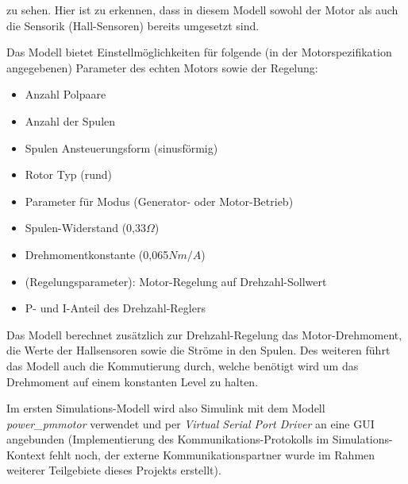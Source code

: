 zu sehen. Hier ist zu erkennen, dass in diesem Modell sowohl der Motor als auch die Sensorik (Hall-Sensoren) bereits umgesetzt sind. 

Das Modell bietet Einstellmöglichkeiten für folgende (in der Motorspezifikation angegebenen) Parameter des echten Motors sowie der Regelung:
\begin{itemize}
	\item Anzahl Polpaare
	\item Anzahl der Spulen
	\item Spulen Ansteuerungsform (sinusförmig)
	\item Rotor Typ (rund)
	\item Parameter für Modus (Generator- oder Motor-Betrieb)
	\item Spulen-Widerstand (0,33$\Omega$) 
	\item Drehmomentkonstante (0,065$Nm/A$)
	\item (Regelungsparameter): Motor-Regelung auf Drehzahl-Sollwert 
	\item P- und I-Anteil des Drehzahl-Reglers
\end{itemize}

Das Modell berechnet zusätzlich zur Drehzahl-Regelung das Motor-Drehmoment, die Werte der Hallsensoren sowie die Ströme in den Spulen. Des weiteren führt das Modell auch die Kommutierung durch, welche benötigt wird um das Drehmoment auf einem konstanten Level zu halten.

Im ersten Simulations-Modell wird also Simulink mit dem Modell \textit{power\_pmmotor} verwendet und per \textit{Virtual Serial Port Driver} an eine GUI angebunden (Implementierung des Kommunikations-Protokolls im Simulations-Kontext fehlt noch, der externe Kommunikationspartner wurde im Rahmen weiterer Teilgebiete dieses Projekts erstellt).


